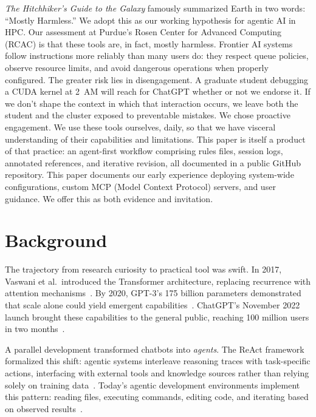 \documentclass[sigconf]{acmart}
\begin{document}
\emph{The Hitchhiker's Guide to the Galaxy} famously summarized Earth in two words:
``Mostly Harmless.'' We adopt this as our working hypothesis for agentic AI in HPC.
Our assessment at Purdue's Rosen Center for Advanced Computing (RCAC) is that these
tools are, in fact, mostly harmless. Frontier AI systems follow instructions more
reliably than many users do: they respect queue policies, observe resource limits, and
avoid dangerous operations when properly configured. The greater risk lies in
disengagement. A graduate student debugging a CUDA kernel at 2~AM will reach for ChatGPT
whether or not we endorse it. If we don't shape the context in which that interaction
occurs, we leave both the student and the cluster exposed to preventable mistakes.
We chose proactive engagement. We use these tools ourselves, daily, so that we have
visceral understanding of their capabilities and limitations. This paper is itself a
product of that practice: an agent-first workflow comprising rules files, session logs,
annotated references, and iterative revision, all documented in a public GitHub
repository. This paper documents our early experience deploying system-wide
configurations, custom MCP (Model Context Protocol) servers, and user guidance. We
offer this as both evidence and invitation.

\section{Background}

The trajectory from research curiosity to practical tool was swift. In 2017, Vaswani et
al.~introduced the Transformer architecture, replacing recurrence with attention
mechanisms~\cite{vaswani2017attention}. By 2020, GPT-3's 175 billion parameters
demonstrated that scale alone could yield emergent capabilities~\cite{brown2020gpt3}.
ChatGPT's November 2022 launch brought these capabilities to the general public,
reaching 100 million users in two months~\cite{openai2022chatgpt}.

A parallel development transformed chatbots into \emph{agents}. The ReAct framework
formalized this shift: agentic systems interleave reasoning traces with task-specific
actions, interfacing with external tools and knowledge sources rather than relying solely
on training data~\cite{yao2023react}. Today's agentic development environments implement
this pattern: reading files, executing commands, editing code, and iterating based on
observed results~\cite{warp2024agentmode}.
\end{document}
